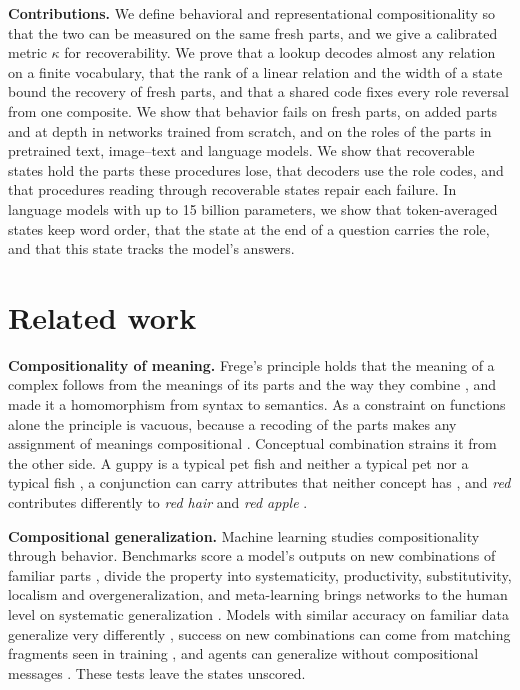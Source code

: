 \textbf{Contributions.} We define behavioral and representational compositionality so that the two can be measured on the same fresh parts, and we give a calibrated metric $\kappa$ for recoverability. We prove that a lookup decodes almost any relation on a finite vocabulary, that the rank of a linear relation and the width of a state bound the recovery of fresh parts, and that a shared code fixes every role reversal from one composite. We show that behavior fails on fresh parts, on added parts and at depth in networks trained from scratch, and on the roles of the parts in pretrained text, image--text and language models. We show that recoverable states hold the parts these procedures lose, that decoders use the role codes, and that procedures reading through recoverable states repair each failure. In language models with up to 15 billion parameters, we show that token-averaged states keep word order, that the state at the end of a question carries the role, and that this state tracks the model's answers.

\section{Related work}
\label{sec:related}

\textbf{Compositionality of meaning.} Frege's principle holds that the meaning of a complex follows from the meanings of its parts and the way they combine \citep{frege1892,frege1923}, and \citet{montague1970} made it a homomorphism from syntax to semantics. As a constraint on functions alone the principle is vacuous, because a recoding of the parts makes any assignment of meanings compositional \citep{zadrozny1994,westerstahl1998}. Conceptual combination strains it from the other side. A guppy is a typical pet fish and neither a typical pet nor a typical fish \citep{osherson1981,fodor1996}, a conjunction can carry attributes that neither concept has \citep{hampton1987}, and \emph{red} contributes differently to \emph{red hair} and \emph{red apple} \citep{kamp1995}.

\textbf{Compositional generalization.} Machine learning studies compositionality through behavior. Benchmarks score a model's outputs on new combinations of familiar parts \citep{lake2018,keysers2020,kim2020cogs}, \citet{hupkes2020} divide the property into systematicity, productivity, substitutivity, localism and overgeneralization, and meta-learning brings networks to the human level on systematic generalization \citep{lake2023}. Models with similar accuracy on familiar data generalize very differently \citep{mccoy2020berts}, success on new combinations can come from matching fragments seen in training \citep{dziri2023}, and agents can generalize without compositional messages \citep{chaabouni2020}. These tests leave the states unscored.

